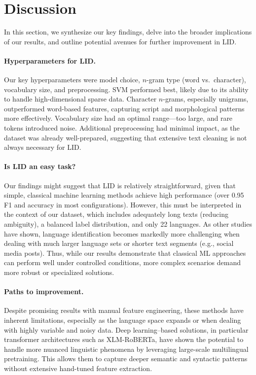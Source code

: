 \section{Discussion}\label{sec:discussion}

In this section, we synthesize our key findings, delve into the broader implications of our results, and outline potential avenues for further improvement in LID.

\paragraph{Hyperparameters for LID.}
Our key hyperparameters were model choice, \(n\)-gram type (word vs.\ character), vocabulary size, and preprocessing. SVM performed best, likely due to its ability to handle high-dimensional sparse data. Character \(n\)-grams, especially unigrams, outperformed word-based features, capturing script and morphological patterns more effectively. Vocabulary size had an optimal range—too large, and rare tokens introduced noise. Additional preprocessing had minimal impact, as the dataset was already well-prepared, suggesting that extensive text cleaning is not always necessary for LID.

\paragraph{Is LID an easy task?}
Our findings might suggest that LID is relatively straightforward, given that simple, classical machine learning methods achieve high performance (over 0.95 F1 and accuracy in most configurations). However, this must be interpreted in the context of our dataset, which includes adequately long texts (reducing ambiguity), a balanced label distribution, and only 22 languages. As other studies have shown, language identification becomes markedly more challenging when dealing with much larger language sets or shorter text segments (e.g., social media posts). Thus, while our results demonstrate that classical ML approaches can perform well under controlled conditions, more complex scenarios demand more robust or specialized solutions. \cite{Jauhiainen2019}

\paragraph{Paths to improvement.}
Despite promising results with manual feature engineering, these methods have inherent limitations, especially as the language space expands or when dealing with highly variable and noisy data. Deep learning–based solutions, in particular transformer architectures such as XLM-RoBERTa, have shown the potential to handle more nuanced linguistic phenomena by leveraging large-scale multilingual pretraining. This allows them to capture deeper semantic and syntactic patterns without extensive hand-tuned feature extraction. \cite{AbhishekPandey2023}